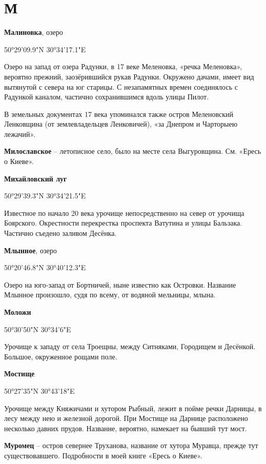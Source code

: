 \chapter*{М}

\textbf{Малиновка}, озеро 

50°29'09.9"N 30°34'17.1"E

Озеро на запад от озера Радунки, в 17 веке  Меленовка, «речка Меленовка», вероятно прежний, заозёрившийся рукав Радунки. Окружено дачами, имеет вид вытянутой с севера на юг старицы. С незапамятных времен соединялось с Радункой каналом, частично сохранившимся вдоль улицы Пилот.

В земельных документах 17 века упоминался также остров Меленовский Ленковщина (от землевладельцев Ленковичей), «за Днепром и Чарторыею лежачий».\\

\medskip

\textbf{Милославское} – летописное село, было на месте села Выгуровщина. См. «Ересь о Киеве».\\

\medskip

\textbf{Михайловский луг} 

50°29'39.3"N 30°34'21.5"E

Известное по начало 20 века урочище непосредственно на север от урочища Боярского. Окрестности перекрестка проспекта Ватутина и улицы Бальзака. Частично съедено заливом Десёнка.\\

\medskip

\textbf{Млынное}, озеро

50°20'46.8"N 30°40'12.3"E

Озеро на юго-запад от Бортничей, ныне известно как Островки. Название Млынное произошло, судя по всему, от водяной мельницы, млына.\\

\medskip

\textbf{Моложи} 

50°30'50"N 30°34'6"E

Урочище к западу от села Троещны, между Ситняками, Городищем и Десёнкой. Большое, окруженное рощами поле.\\

\medskip

\textbf{Мостище}

50°27'35"N 30°43'18"E

Урочище между Княжичами и хутором Рыбный, лежит в пойме речки Дарницы, в лесу между нею и железной дорогой. При Мостище на Дарнице расположено несколько давних прудов. Название, вероятно, намекает на бывший тут мост.\\

\medskip

\textbf{Муромец} – остров севернее Труханова, название от хутора Муравца, прежде тут существовавшего. Подробности в моей книге «Ересь о Киеве».
